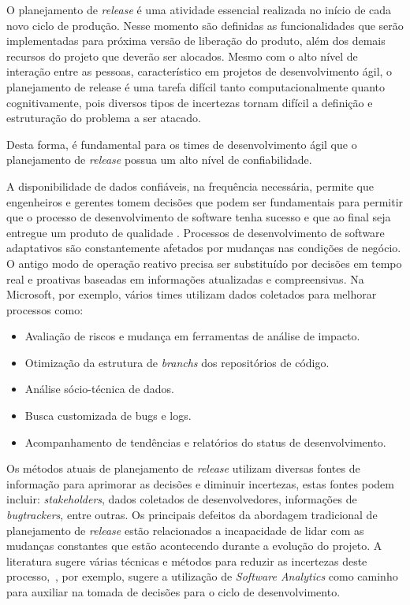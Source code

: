 O planejamento de \textit{release} é uma atividade essencial realizada no início de cada novo ciclo de produção. Nesse momento são definidas as funcionalidades que serão implementadas para próxima versão de liberação do produto, além dos demais recursos do projeto que deverão ser alocados. Mesmo com o alto nível de interação entre as pessoas, característico em projetos de desenvolvimento ágil, o planejamento de release é uma tarefa difícil tanto computacionalmente quanto cognitivamente, pois diversos tipos de incertezas tornam difícil a definição e estruturação do problema a ser atacado\cite{Ngo}.

Desta forma, é fundamental para os times de desenvolvimento ágil que o planejamento de \textit{release} possua um alto nível de confiabilidade\cite{McDaid}.

A disponibilidade de dados confiáveis, na frequência necessária, permite que engenheiros e gerentes tomem decisões que podem ser fundamentais para permitir que o processo de desenvolvimento de software tenha sucesso e que ao final seja entregue um produto de qualidade \cite{codemine}. Processos de desenvolvimento de software adaptativos são constantemente afetados por mudanças nas condições de negócio. O antigo modo de operação reativo precisa ser substituído por decisões em tempo real e proativas baseadas em informações atualizadas e compreensivas\cite{artAndScience}. Na Microsoft, por exemplo, vários times utilizam dados coletados para melhorar processos como:

\begin{itemize}
    \item Avaliação de riscos e mudança em ferramentas de análise de impacto.
    \item Otimização da estrutura de \textit{branchs} dos repositórios de código.
    \item Análise sócio-técnica de dados.
    \item Busca customizada de bugs e logs.
    \item Acompanhamento de tendências e relatórios do status de desenvolvimento.
\end{itemize}

    Os métodos atuais de planejamento de \textit{release} utilizam diversas fontes de informação para aprimorar as decisões e diminuir incertezas, estas fontes podem incluir: \textit{stakeholders}, dados coletados de desenvolvedores, informações de \textit{bugtrackers}, entre outras. Os principais defeitos da abordagem tradicional de planejamento de \textit{release} estão relacionados a incapacidade de lidar com as mudanças constantes que estão acontecendo durante a evolução do projeto. A literatura sugere várias técnicas e métodos para reduzir as incertezas deste processo,~\cite{artAndScience}, por exemplo, sugere a utilização de \textit{Software Analytics} como caminho para auxiliar na tomada de decisões para o ciclo de desenvolvimento.

